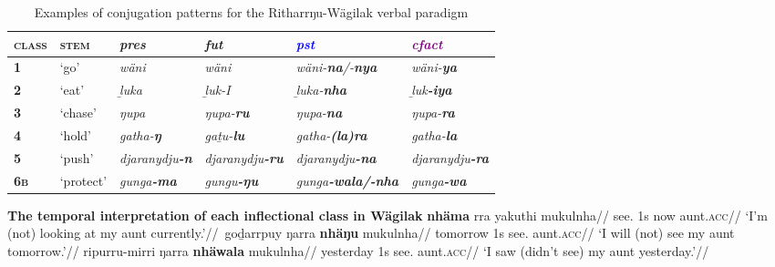 \begin{table}[h]\caption{Examples of conjugation patterns for the Ritharrŋu-Wägilak verbal paradigm \citep[adapted from][63--6]{Heath1980r}}\label{rit.paradigm}\small
	\begin{tabular}{>{\bf}l>{\sc}l>{\it}l>{\it}l>{\it}l>{\it}l}\toprule
		\textsc{class} & \textsc{stem} & \textcolor{forest}{\gls{pres}} & \textcolor{ochre}{\gls{fut}} & \textcolor{blue}{\gls{pst}}\footnotemark & \textcolor{purple}{\gls{cfact}}\\\midrule
		1 & `go' &	wäni & wäni & wäni-\textbf{na}/-\textbf{nya} & wäni-\textbf{ya}\\
 2& `eat' & ḻuka & ḻuk-\gls{I} & ḻuka-\textbf{nha}& ḻuk\textbf{-iya}\\
 3& `chase'& ŋupa& ŋupa-\textbf{ru}&ŋupa-\textbf{na} &ŋupa-\textbf{ra} \\
 4&`hold' & gatha-\textbf{ŋ} &gaṯu-\textbf{lu} &gatha-\textbf{(la)ra} & gatha-\textbf{la} \\
 5&`push' &djaranydju\textbf{-n} &djaranydju\textbf{-ru} &djaranydju\textbf{-na} &djaranydju\textbf{-ra} \\
 6\textsc{b}&`protect' &gunga\textbf{-ma} & gungu\textbf{-ŋu}& gunga\textbf{-wala/-nha} & gunga\textbf{-wa}\\\bottomrule
	\end{tabular}
\end{table}



\pex \textbf{The temporal interpretation of each inflectional class in Wägilak}\label{wag-infls}
\a\begingl\gla {}\textbf{nhäma} rra yakuthi mukulnha//
\glb see.\textbf{{\I}} 1s now aunt.\textsc{acc}//
\glft`I'm (not) looking at my aunt currently.'\trailingcitation{[RN~20190520]}//\endgl{}\
\a\begingl\gla {}goḏarrpuy ŋarra \textbf{nhäŋu} mukulnha//
\glb tomorrow 1s see.\II{} aunt.\textsc{acc}//
\glft`I will (not) see my aunt tomorrow.'\trailingcitation{[DW~20190522]}//\endgl
\a\begingl\gla \rightcomment{\textcolor{blue}{\textbf{[\textsc{yesterday past}]}}}ripurru-mirri ŋarra \textbf{nhäwala} mukulnha//
\glb yesterday 1s see.\textbf{\III} aunt.\textsc{acc}//
\glft`I saw (didn't see) my aunt yesterday.'\trailingcitation{[RŊ~20190522]}//\endgl{}
\xe

